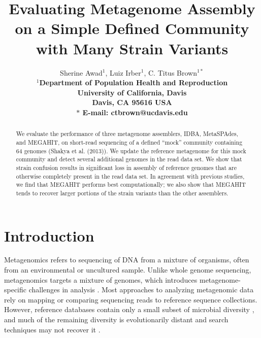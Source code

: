 \documentclass[11pt]{article}
\begin{document}
\title{Evaluating Metagenome Assembly on a Simple Defined Community with Many Strain Variants}

\author{Sherine Awad$^{1}$, Luiz Irber$^{1}$, C. Titus Brown$^{1\ast}$\\
\small
\bf{$^1$}Department of Population Health and Reproduction \\
\small
University of California, Davis\\
\small
Davis, CA 95616 USA\\
\small
$\ast$ E-mail: ctbrown@ucdavis.edu
} 

\maketitle


\begin{abstract}
 
  We evaluate the performance of three metagenome assemblers, IDBA,
  MetaSPAdes, and MEGAHIT, on short-read sequencing of a defined ``mock''
  community containing 64 genomes (Shakya et al. (2013)).  We update
  the reference metagenome for this mock community and detect several
  additional genomes in the read data set.  We show that strain
  confusion results in significant loss in assembly of reference
  genomes that are otherwise completely present in the read data set.
  In agreement with previous studies, we find that MEGAHIT performs
  best computationally; we also show that MEGAHIT tends to recover
  larger portions of the strain variants than the other assemblers.
  
\end{abstract}

\clearpage

\section*{Introduction}

Metagenomics refers to sequencing of DNA from a mixture of organisms,
often from an environmental or uncultured sample. Unlike whole genome
sequencing, metagenomics targets a mixture of genomes, which
introduces metagenome-specific challenges in analysis
\cite{ghurye2016metagenomic}.  Most approaches to analyzing
metagenomic data rely on mapping or comparing sequencing reads to
reference sequence collections. However, reference databases contain
only a small subset of microbial diversity \cite{geba}, and much
of the remaining diversity is evolutionarily distant and search
techniques may not recover it \cite{CAMI}.
\end{document}
